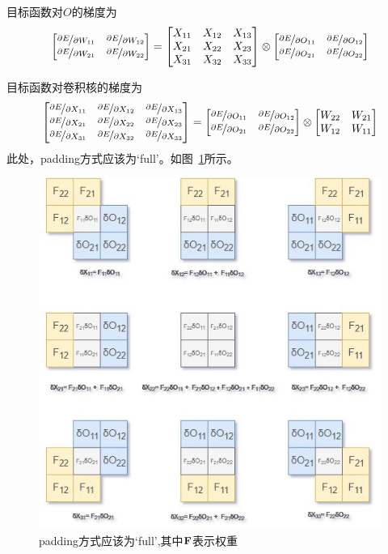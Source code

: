 \documentclass[12pt]{article}
\newcommand{\pp}[2]{\nicefrac{\partial #1}{\partial #2}}
\begin{document}
目标函数对$O$的梯度为
\begin{equation}
	\begin{bmatrix}
		\pp{E}{W_{11}} & \pp{E}{W_{12}} \\
		\pp{E}{W_{21}} & \pp{E}{W_{22}}
	\end{bmatrix} =
	\begin{bmatrix}
		X_{11} & X_{12} & X_{13} \\
		X_{21} & X_{22} & X_{23} \\
		X_{31} & X_{32} & X_{33}
	\end{bmatrix}
	\otimes
	\begin{bmatrix}
		\pp{E}{O_{11}} & \pp{E}{O_{12}}  \\
		\pp{E}{O_{21}} & \pp{E}{O_{22} }
	\end{bmatrix}
\end{equation}

目标函数对卷积核的梯度为
\begin{equation}
	\begin{bmatrix}
		\pp{E}{X_{11}}  & \pp{E}{X_{12}}  & \pp{E}{X_{13}}  \\
		\pp{E}{X_{21} } & \pp{E}{X_{22}}  & \pp{E}{X_{23}}  \\
		\pp{E}{X_{31} } & \pp{E}{X_{32} } & \pp{E}{X_{33} }
	\end{bmatrix} =
	\begin{bmatrix}
		\pp{E}{O_{11}} & \pp{E}{O_{12}}  \\
		\pp{E}{O_{21}} & \pp{E}{O_{22} }
	\end{bmatrix}
	\otimes
	\begin{bmatrix}
		W_{22} & W_{21} \\
		W_{12} & W_{11}
	\end{bmatrix}
\end{equation}
此处，padding方式应该为`full'。如图~\ref{fig:full}所示。

\begin{figure}
	\centering
	\includegraphics[width=.8\textwidth]{fig/2018-04-24-19-27-44.png}
	\caption{padding方式应该为`full',其中$\mathbf{F}$表示权重} \label{fig:full}
\end{figure}
\end{document}
